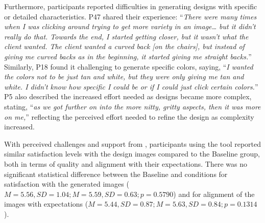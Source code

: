 Furthermore, participants reported difficulties in generating designs with specific or detailed characteristics. P47 shared their experience: ``\textit{There were many times when I was clicking around trying to get more variety in an image… but it didn't really do that. Towards the end, I started getting closer, but it wasn't what the client wanted. The client wanted a curved back [on the chairs], but instead of giving me curved backs as in the beginning, it started giving me straight backs.}'' Similarly, P18 found it challenging to generate specific colors, saying, ``\textit{I wanted the colors not to be just tan and white, but they were only giving me tan and white. I didn't know how specific I could be or if I could just click certain colors.}'' P5 also described the increased effort needed as designs became more complex, stating, ``\textit{as we got further on into the more nitty, gritty aspects, then it was more on me,}'' reflecting the perceived effort needed to refine the design as complexity increased.

With perceived challenges and support from \toolname{}, participants using the tool reported similar satisfaction levels with the design images compared to the Baseline group, both in terms of quality and alignment with their expectations. There was no significant statistical difference between the Baseline and \toolname{} conditions for satisfaction with the generated images ($M = 5.56, SD = 1.04; M = 5.59, SD = 0.63; p = 0.5790$) and for alignment of the images with expectations ($M = 5.44, SD = 0.87; M = 5.63, SD = 0.84; p = 0.1314$).
